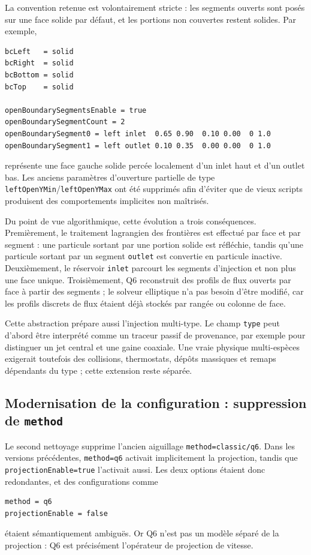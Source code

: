 \documentclass[11pt,a4paper]{article}
\begin{document}
La convention retenue est volontairement stricte : les segments ouverts sont posés sur une face solide par défaut, et les portions non couvertes restent solides. Par exemple,
\begin{verbatim}
bcLeft   = solid
bcRight  = solid
bcBottom = solid
bcTop    = solid

openBoundarySegmentsEnable = true
openBoundarySegmentCount = 2
openBoundarySegment0 = left inlet  0.65 0.90  0.10 0.00  0 1.0
openBoundarySegment1 = left outlet 0.10 0.35  0.00 0.00  0 1.0
\end{verbatim}
représente une face gauche solide percée localement d'un inlet haut et d'un outlet bas. Les anciens paramètres d'ouverture partielle de type \texttt{leftOpenYMin}/\texttt{leftOpenYMax} ont été supprimés afin d'éviter que de vieux scripts produisent des comportements implicites non maîtrisés.

Du point de vue algorithmique, cette évolution a trois conséquences. Premièrement, le traitement lagrangien des frontières est effectué par face et par segment : une particule sortant par une portion solide est réfléchie, tandis qu'une particule sortant par un segment \texttt{outlet} est convertie en particule inactive. Deuxièmement, le réservoir \texttt{inlet} parcourt les segments d'injection et non plus une face unique. Troisièmement, Q6 reconstruit des profils de flux ouverts par face à partir des segments ; le solveur elliptique n'a pas besoin d'être modifié, car les profils discrets de flux étaient déjà stockés par rangée ou colonne de face.

Cette abstraction prépare aussi l'injection multi-type. Le champ \texttt{type} peut d'abord être interprété comme un traceur passif de provenance, par exemple pour distinguer un jet central et une gaine coaxiale. Une vraie physique multi-espèces exigerait toutefois des collisions, thermostats, dépôts massiques et remaps dépendants du type ; cette extension reste séparée.

\subsection{Modernisation de la configuration : suppression de \texttt{method}}

Le second nettoyage supprime l'ancien aiguillage \texttt{method=classic/q6}. Dans les versions précédentes, \texttt{method=q6} activait implicitement la projection, tandis que \texttt{projectionEnable=true} l'activait aussi. Les deux options étaient donc redondantes, et des configurations comme
\begin{verbatim}
method = q6
projectionEnable = false
\end{verbatim}
étaient sémantiquement ambiguës. Or Q6 n'est pas un modèle séparé de la projection : Q6 est précisément l'opérateur de projection de vitesse.
\end{document}
